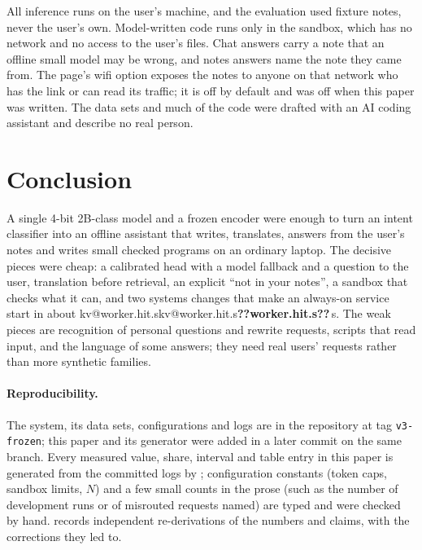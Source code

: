 \documentclass[11pt,a4paper]{article}
\makeatletter
\DeclareRobustCommand{\kv}[1]{\ifcsname kv@#1\endcsname\csname kv@#1\endcsname\else\textbf{??#1??}\fi}
\newcommand{\s}{\,s}
\makeatother
\begin{document}
All inference runs on the user's machine, and the evaluation used fixture notes, never the user's own. Model-written
code runs only in the sandbox, which has no network and no access to the user's files. Chat answers carry a note that
an offline small model may be wrong, and notes answers name the note they came from. The page's wifi option exposes the
notes to anyone on that network who has the link or can read its traffic; it is off by default and was off when this
paper was written. The data sets and much of the code were drafted with an AI coding assistant and describe no real
person.

\section{Conclusion}\label{sec:conclusion}

A single 4-bit 2B-class model and a frozen encoder were enough to turn an intent classifier into an offline assistant
that writes, translates, answers from the user's notes and writes small checked programs on an ordinary laptop. The
decisive pieces were cheap: a calibrated head with a model fallback and a question to the user, translation before
retrieval, an explicit ``not in your notes'', a sandbox that checks what it can, and two systems changes that make an
always-on service start in about \kv{worker.hit.s}\s. The weak pieces are recognition of personal questions and rewrite
requests, scripts that read input, and the language of some answers; they need real users' requests rather than more
synthetic families.

\paragraph{Reproducibility.} The system, its data sets, configurations and logs are in the repository at tag
\texttt{v3-frozen}; this paper and its generator were added in a later commit on the same branch. Every measured value,
share, interval and table entry in this paper is generated from the committed logs by
; configuration constants (token caps, sandbox limits, $N$) and a few
small counts in the prose (such as the number of development runs or of misrouted requests named) are typed and were
checked by hand. 
records independent re-derivations of the numbers and claims, with the corrections they led to.



\end{document}
